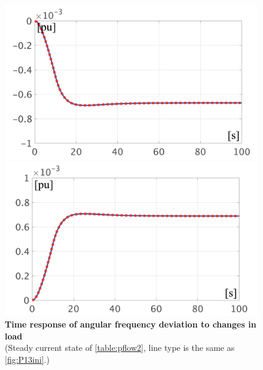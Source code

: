 \documentclass[graybox, envcountchap]{svmult}
\begin{document}
\begin{figure}[t]
  \centering
  {
  \begin{minipage}{0.49\linewidth}
    \centering
    \includegraphics[width = 1.0\linewidth]{figs/P3mi}
  \end{minipage}
  \begin{minipage}{0.49\linewidth}
    \centering
    \includegraphics[width = 1.0\linewidth]{figs/P3pl}
  \end{minipage}
  \medskip
  \caption{\textbf{Time response of angular frequency deviation to changes in load}
  \\ \centering(Steady current state of \ref{table:pflow2}, line type is the same as \ref{fig:P13ini}.)}
  \label{fig:P3load}
  }
\medskip
\end{figure}
\end{document}
